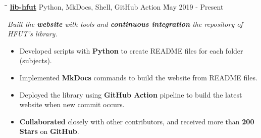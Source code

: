 \documentclass{res}
\begin{document}
\begin{resume}
    \vspace{-0.2in}	 
    \begin{tabbing}
    \hspace{2.391in}\= \hspace{3in}\= \kill %
    \href{https://github.com/lib-hfut/lib-hfut}{\bf lib-hfut}  \> 
                Python, MkDocs, Shell, GitHub Action \` May 2019 - Present \\
    \end{tabbing}\vspace{-20pt}      %
    \vspace{-0.13in}
    \textit{Built the {\bf website} with tools and {\bf continuous integration} the repository of 
            HFUT's library.}
    \vspace{+0.05in}
    \begin{itemize} \itemsep 0.5pt %
        \item Developed scripts with {\bf Python} to create README files for each folder (subjects). 
        \item Implemented {\bf MkDocs} commands to build the website from README files.
        \item Deployed the library using {\bf GitHub Action} pipeline to build the latest website 
                when new commit occurs.
        \item {\bf Collaborated} closely with other contributors, and received more than 
                {\bf 200 Stars} on {\bf GitHub}.
    \end{itemize}

\end{resume}
\end{document}
